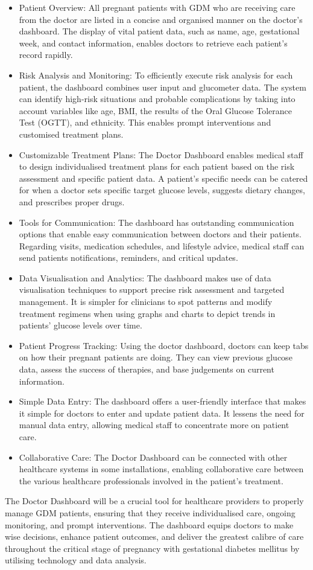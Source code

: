 \documentclass[conference,compsoc]{IEEEtran}
\begin{document}
\begin{itemize}
    \item Patient Overview: All pregnant patients with GDM who are receiving care from the doctor are listed in a concise and organised manner on the doctor's dashboard. The display of vital patient data, such as name, age, gestational week, and contact information, enables doctors to retrieve each patient's record rapidly.
    \item Risk Analysis and Monitoring: To efficiently execute risk analysis for each patient, the dashboard combines user input and glucometer data. The system can identify high-risk situations and probable complications by taking into account variables like age, BMI, the results of the Oral Glucose Tolerance Test (OGTT), and ethnicity. This enables prompt interventions and customised treatment plans.
 \item Customizable Treatment Plans: The Doctor Dashboard enables medical staff to design individualised treatment plans for each patient based on the risk assessment and specific patient data. A patient's specific needs can be catered for when a doctor sets specific target glucose levels, suggests dietary changes, and prescribes proper drugs.
  \item Tools for Communication: The dashboard has outstanding communication options that enable easy communication between doctors and their patients. Regarding visits, medication schedules, and lifestyle advice, medical staff can send patients notifications, reminders, and critical updates.
\item Data Visualisation and Analytics: The dashboard makes use of data visualisation techniques to support precise risk assessment and targeted management. It is simpler for clinicians to spot patterns and modify treatment regimens when using graphs and charts to depict trends in patients' glucose levels over time.
\item Patient Progress Tracking: Using the doctor dashboard, doctors can keep tabs on how their pregnant patients are doing. They can view previous glucose data, assess the success of therapies, and base judgements on current information.
\item Simple Data Entry: The dashboard offers a user-friendly interface that makes it simple for doctors to enter and update patient data. It lessens the need for manual data entry, allowing medical staff to concentrate more on patient care.
\item Collaborative Care: The Doctor Dashboard can be connected with other healthcare systems in some installations, enabling collaborative care between the various healthcare professionals involved in the patient's treatment.
\end{itemize}
The Doctor Dashboard will be a crucial tool for healthcare providers to properly manage GDM patients, ensuring that they receive individualised care, ongoing monitoring, and prompt interventions. The dashboard equips doctors to make wise decisions, enhance patient outcomes, and deliver the greatest calibre of care throughout the critical stage of pregnancy with gestational diabetes mellitus by utilising technology and data analysis.
\end{document}
